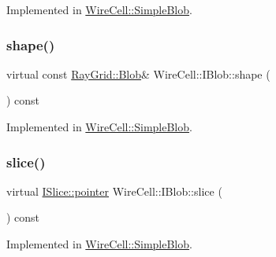 Implemented in \hyperlink{class_wire_cell_1_1_simple_blob_a0eb326289c6563bc64e2cca032022631}{Wire\+Cell\+::\+Simple\+Blob}.

\mbox{\label{class_wire_cell_1_1_i_blob_a241a18f7f178a2021c643ffb6eed6e3f}} 
\subsubsection{\texorpdfstring{shape()}{shape()}}
{\footnotesize\ttfamily virtual const \hyperlink{class_wire_cell_1_1_ray_grid_1_1_blob}{Ray\+Grid\+::\+Blob}\& Wire\+Cell\+::\+I\+Blob\+::shape (\begin{DoxyParamCaption}{ }\end{DoxyParamCaption}) const\hspace{0.3cm}{\ttfamily [pure virtual]}}



Implemented in \hyperlink{class_wire_cell_1_1_simple_blob_ab681a5c8c24fe4eed58344a7443a1484}{Wire\+Cell\+::\+Simple\+Blob}.

\mbox{\label{class_wire_cell_1_1_i_blob_a92f1e4a99d85edf6c3d8c9abf74b8a19}} 
\subsubsection{\texorpdfstring{slice()}{slice()}}
{\footnotesize\ttfamily virtual \hyperlink{class_wire_cell_1_1_i_data_aff870b3ae8333cf9265941eef62498bc}{I\+Slice\+::pointer} Wire\+Cell\+::\+I\+Blob\+::slice (\begin{DoxyParamCaption}{ }\end{DoxyParamCaption}) const\hspace{0.3cm}{\ttfamily [pure virtual]}}



Implemented in \hyperlink{class_wire_cell_1_1_simple_blob_a0368534dca8425f5a5ef5498debd97c7}{Wire\+Cell\+::\+Simple\+Blob}.

\mbox{\label{class_wire_cell_1_1_i_blob_a02f100fb7404321e90471bd2430381e4}} 
